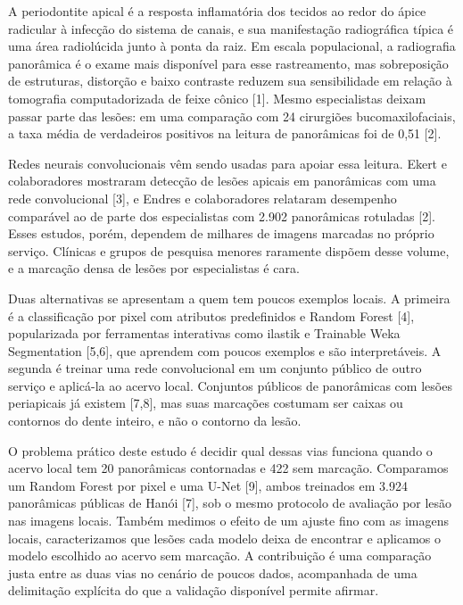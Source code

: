 \documentclass[twocolumn]{article}
\begin{document}
A periodontite apical é a resposta inflamatória dos tecidos ao redor do ápice radicular à infecção do sistema de canais, e sua manifestação radiográfica típica é uma área radiolúcida junto à ponta da raiz. Em escala populacional, a radiografia panorâmica é o exame mais disponível para esse rastreamento, mas sobreposição de estruturas, distorção e baixo contraste reduzem sua sensibilidade em relação à tomografia computadorizada de feixe cônico [1]. Mesmo especialistas deixam passar parte das lesões: em uma comparação com 24 cirurgiões bucomaxilofaciais, a taxa média de verdadeiros positivos na leitura de panorâmicas foi de 0,51 [2].

Redes neurais convolucionais vêm sendo usadas para apoiar essa leitura. Ekert e colaboradores mostraram detecção de lesões apicais em panorâmicas com uma rede convolucional [3], e Endres e colaboradores relataram desempenho comparável ao de parte dos especialistas com 2.902 panorâmicas rotuladas [2]. Esses estudos, porém, dependem de milhares de imagens marcadas no próprio serviço. Clínicas e grupos de pesquisa menores raramente dispõem desse volume, e a marcação densa de lesões por especialistas é cara.

Duas alternativas se apresentam a quem tem poucos exemplos locais. A primeira é a classificação por pixel com atributos predefinidos e Random Forest [4], popularizada por ferramentas interativas como ilastik e Trainable Weka Segmentation [5,6], que aprendem com poucos exemplos e são interpretáveis. A segunda é treinar uma rede convolucional em um conjunto público de outro serviço e aplicá-la ao acervo local. Conjuntos públicos de panorâmicas com lesões periapicais já existem [7,8], mas suas marcações costumam ser caixas ou contornos do dente inteiro, e não o contorno da lesão.

O problema prático deste estudo é decidir qual dessas vias funciona quando o acervo local tem 20 panorâmicas contornadas e 422 sem marcação. Comparamos um Random Forest por pixel e uma U-Net [9], ambos treinados em 3.924 panorâmicas públicas de Hanói [7], sob o mesmo protocolo de avaliação por lesão nas imagens locais. Também medimos o efeito de um ajuste fino com as imagens locais, caracterizamos que lesões cada modelo deixa de encontrar e aplicamos o modelo escolhido ao acervo sem marcação. A contribuição é uma comparação justa entre as duas vias no cenário de poucos dados, acompanhada de uma delimitação explícita do que a validação disponível permite afirmar.

\end{document}
